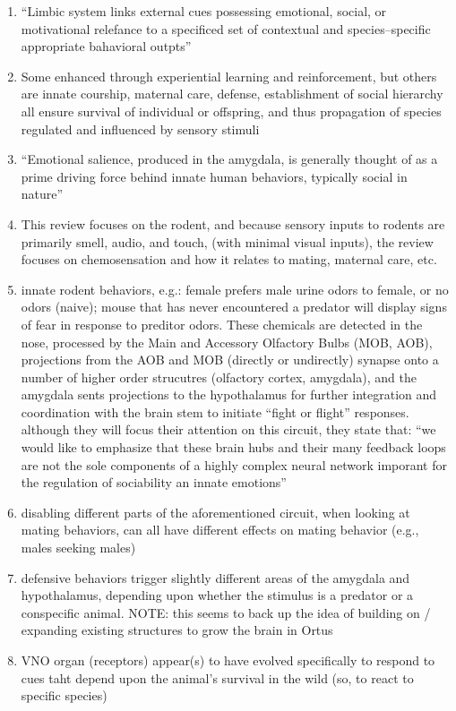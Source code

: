 \documentclass[11pt, a4paper, oneside]{article}   	%
\begin{document}
\begin{enumerate}
  \item ``Limbic system links external cues possessing emotional, social, or motivational relefance to a specificed set of contextual and species--specific appropriate bahavioral outpts''
  \item Some enhanced through experiential learning and reinforcement, but others are innate
    \subitem courship, maternal care, defense, establishment of social hierarchy \rarrow all ensure survival of individual or offspring, and thus propagation of species
    \subitem regulated and influenced by sensory stimuli
  \item ``Emotional salience, produced in the amygdala, is generally thought of as a prime driving force behind innate human behaviors, typically social in nature''
  \item This review focuses on the rodent, and because sensory inputs to rodents are primarily smell, audio, and touch, (with minimal visual inputs), the review focuses on chemosensation and how it relates to mating, maternal care, etc.
    \item innate rodent behaviors, e.g.: female prefers male urine odors to female, or no odors (naive); mouse that has never encountered a predator will display signs of fear in response to preditor odors.
    \subitem These chemicals are detected in the nose, processed by the Main and Accessory Olfactory Bulbs (MOB, AOB), projections from the AOB and MOB (directly or undirectly) synapse onto a number of higher order strucutres (olfactory cortex, amygdala), and the amygdala sents projections to the hypothalamus for further integration and coordination with the brain stem to initiate ``fight or flight'' responses.
        \subsubitem although they will focus their attention on this circuit, they state that: ``we would like to emphasize that these brain hubs and their many feedback loops are not the sole components of a highly complex neural network imporant for the regulation of sociability an innate emotions''
      \item disabling different parts of the aforementioned circuit, when looking at mating behaviors, can all have different effects on mating behavior (e.g., males seeking males)
      \item defensive behaviors trigger slightly different areas of the amygdala and hypothalamus, depending upon whether the stimulus is a predator or a conspecific animal.
        \subitem NOTE: this seems to back up the idea of building on / expanding existing structures to grow the brain in Ortus
      \item VNO organ (receptors) appear(s) to have evolved specifically to respond to cues taht depend upon the animal's survival in the wild (so, to react to specific species)
\end{enumerate}
\end{document}
